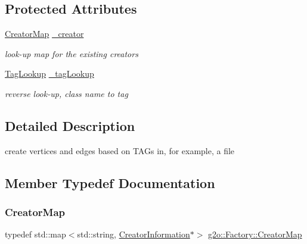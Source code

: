 \subsection*{Protected Attributes}
\begin{DoxyCompactItemize}
\item 
\mbox{\hyperlink{classg2o_1_1_factory_a639c8d850892dddc20098e9aa97ef9e8}{Creator\+Map}} \mbox{\hyperlink{classg2o_1_1_factory_a38e27fb1014dfb8691f4df045ebb5130}{\+\_\+creator}}
\begin{DoxyCompactList}\small\item\em look-\/up map for the existing creators \end{DoxyCompactList}\item 
\mbox{\hyperlink{classg2o_1_1_factory_aba274179c053b3b71dcef6a20c898496}{Tag\+Lookup}} \mbox{\hyperlink{classg2o_1_1_factory_a93fbd79ea000ed88101c1f23b19e6e2a}{\+\_\+tag\+Lookup}}
\begin{DoxyCompactList}\small\item\em reverse look-\/up, class name to tag \end{DoxyCompactList}\end{DoxyCompactItemize}


\subsection{Detailed Description}
create vertices and edges based on T\+A\+Gs in, for example, a file 

\subsection{Member Typedef Documentation}
\mbox{\label{classg2o_1_1_factory_a639c8d850892dddc20098e9aa97ef9e8}} 
\subsubsection{\texorpdfstring{Creator\+Map}{CreatorMap}}
{\footnotesize\ttfamily typedef std\+::map$<$std\+::string, \mbox{\hyperlink{classg2o_1_1_factory_1_1_creator_information}{Creator\+Information}}$\ast$$>$ \mbox{\hyperlink{classg2o_1_1_factory_a639c8d850892dddc20098e9aa97ef9e8}{g2o\+::\+Factory\+::\+Creator\+Map}}\hspace{0.3cm}{\ttfamily [protected]}}

